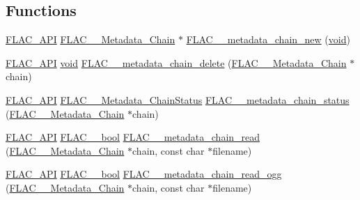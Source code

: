 \subsection*{Functions}
\begin{DoxyCompactItemize}
\item 
\mbox{\hyperlink{group__flac__export_ga56ca07df8a23310707732b1c0007d6f5}{F\+L\+A\+C\+\_\+\+A\+PI}} \mbox{\hyperlink{group__flac__metadata__level2_gaec6993c60b88f222a52af86f8f47bfdf}{F\+L\+A\+C\+\_\+\+\_\+\+Metadata\+\_\+\+Chain}} $\ast$ \mbox{\hyperlink{group__flac__metadata__level2_gafd1f4f58af29325b067ebc5dc34a0f69}{F\+L\+A\+C\+\_\+\+\_\+metadata\+\_\+chain\+\_\+new}} (\mbox{\hyperlink{_s_d_l__opengles2__gl2ext_8h_ae5d8fa23ad07c48bb609509eae494c95}{void}})
\item 
\mbox{\hyperlink{group__flac__export_ga56ca07df8a23310707732b1c0007d6f5}{F\+L\+A\+C\+\_\+\+A\+PI}} \mbox{\hyperlink{_s_d_l__opengles2__gl2ext_8h_ae5d8fa23ad07c48bb609509eae494c95}{void}} \mbox{\hyperlink{group__flac__metadata__level2_ga178898eef72ba9d569b1964fffcb4a8b}{F\+L\+A\+C\+\_\+\+\_\+metadata\+\_\+chain\+\_\+delete}} (\mbox{\hyperlink{group__flac__metadata__level2_gaec6993c60b88f222a52af86f8f47bfdf}{F\+L\+A\+C\+\_\+\+\_\+\+Metadata\+\_\+\+Chain}} $\ast$chain)
\item 
\mbox{\hyperlink{group__flac__export_ga56ca07df8a23310707732b1c0007d6f5}{F\+L\+A\+C\+\_\+\+A\+PI}} \mbox{\hyperlink{group__flac__metadata__level2_gafe2a924893b0800b020bea8160fd4531}{F\+L\+A\+C\+\_\+\+\_\+\+Metadata\+\_\+\+Chain\+Status}} \mbox{\hyperlink{group__flac__metadata__level2_ga3d030e216a6517f23372bb76f0639127}{F\+L\+A\+C\+\_\+\+\_\+metadata\+\_\+chain\+\_\+status}} (\mbox{\hyperlink{group__flac__metadata__level2_gaec6993c60b88f222a52af86f8f47bfdf}{F\+L\+A\+C\+\_\+\+\_\+\+Metadata\+\_\+\+Chain}} $\ast$chain)
\item 
\mbox{\hyperlink{group__flac__export_ga56ca07df8a23310707732b1c0007d6f5}{F\+L\+A\+C\+\_\+\+A\+PI}} \mbox{\hyperlink{ordinals_8h_a95103469f1cbd78b8cf250194985b34e}{F\+L\+A\+C\+\_\+\+\_\+bool}} \mbox{\hyperlink{group__flac__metadata__level2_gadb7d8e9a82aeb43e256f0a948adf5c45}{F\+L\+A\+C\+\_\+\+\_\+metadata\+\_\+chain\+\_\+read}} (\mbox{\hyperlink{group__flac__metadata__level2_gaec6993c60b88f222a52af86f8f47bfdf}{F\+L\+A\+C\+\_\+\+\_\+\+Metadata\+\_\+\+Chain}} $\ast$chain, const char $\ast$filename)
\item 
\mbox{\hyperlink{group__flac__export_ga56ca07df8a23310707732b1c0007d6f5}{F\+L\+A\+C\+\_\+\+A\+PI}} \mbox{\hyperlink{ordinals_8h_a95103469f1cbd78b8cf250194985b34e}{F\+L\+A\+C\+\_\+\+\_\+bool}} \mbox{\hyperlink{group__flac__metadata__level2_gae7b34f2929bedea0e14ac14aca253a40}{F\+L\+A\+C\+\_\+\+\_\+metadata\+\_\+chain\+\_\+read\+\_\+ogg}} (\mbox{\hyperlink{group__flac__metadata__level2_gaec6993c60b88f222a52af86f8f47bfdf}{F\+L\+A\+C\+\_\+\+\_\+\+Metadata\+\_\+\+Chain}} $\ast$chain, const char $\ast$filename)

\end{DoxyCompactItemize}
